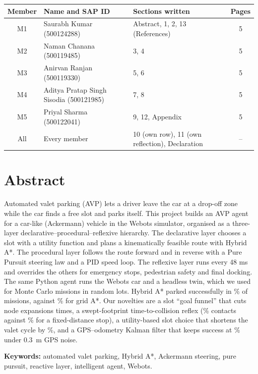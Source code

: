 \documentclass[12pt,a4paper]{article}
\begin{document}
\renewcommand{\arraystretch}{1.6}
\begin{tabular}{|c|P{4.6cm}|P{5.4cm}|c|}
\hline
\textbf{Member} & \textbf{Name and SAP ID} & \textbf{Sections written} & \textbf{Pages} \\ \hline
M1 & Saurabh Kumar (500124288) & Abstract, 1, 2, 13 (References) & 5 \\ \hline
M2 & Naman Chanana (500119485) & 3, 4 & 5 \\ \hline
M3 & Anirvan Ranjan (500119330) & 5, 6 & 5 \\ \hline
M4 & Aditya Pratap Singh Sisodia (500121985) & 7, 8 & 5 \\ \hline
M5 & Priyal Sharma (500122041) & 9, 12, Appendix & 5 \\ \hline
All & Every member & 10 (own row), 11 (own reflection), Declaration & -- \\ \hline
\end{tabular}
\renewcommand{\arraystretch}{1.2}
\newpage

\section*{Abstract}
Automated valet parking (AVP) lets a driver leave the car at a drop-off zone while the car finds a free slot and parks itself. This project builds an AVP agent for a car-like (Ackermann) vehicle in the Webots simulator, organised as a three-layer declarative--procedural--reflexive hierarchy. The declarative layer chooses a slot with a utility function and plans a kinematically feasible route with Hybrid A*. The procedural layer follows the route forward and in reverse with a Pure Pursuit steering law and a PID speed loop. The reflexive layer runs every 48 ms and overrides the others for emergency stops, pedestrian safety and final docking. The same Python agent runs the Webots car and a headless twin, which we used for \NMissions{} Monte Carlo missions in random lots. Hybrid A* parked successfully in \EOneSuccFunnel\% of missions, against \EOneSuccGrid\% for grid A*. Our novelties are a slot ``goal funnel'' that cuts node expansions \EOneExpRatio{} times, a swept-footprint time-to-collision reflex (\EThreeCollTTC\% contacts against \EThreeCollFixed\% for a fixed-distance stop), a utility-based slot choice that shortens the valet cycle by \EFourCycleGain\%, and a GPS--odometry Kalman filter that keeps success at \EFiveKFThree\% under 0.3~m GPS noise.

\textbf{Keywords:} automated valet parking, Hybrid A*, Ackermann steering, pure pursuit, reactive layer, intelligent agent, Webots.
\newpage
\end{document}
